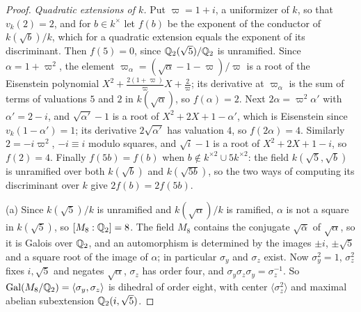 \begin{proof}
\emph{Quadratic extensions of $k$.} Put $\varpi=1+i$, a uniformizer of $k$,
so that $v_k(2)=2$, and for $b\in k^\times$ let $f(b)$ be the exponent of the
conductor of $k(\sqrt b)/k$, which for a quadratic extension equals the
exponent of its discriminant. Then $f(5)=0$, since $\mathbb Q_2(\sqrt5)/\mathbb Q_2$ is
unramified. Since $\alpha=1+\varpi^2$, the element
$\varpi_\alpha=(\sqrt\alpha-1-\varpi)/\varpi$ is a root of the Eisenstein
polynomial $X^2+\frac{2(1+\varpi)}\varpi X+\frac2\varpi$; its derivative at
$\varpi_\alpha$ is the sum of terms of valuations $5$ and $2$ in
$k(\sqrt\alpha)$, so $f(\alpha)=2$. Next $2\alpha=\varpi^2\alpha'$ with
$\alpha'=2-i$, and $\sqrt{\alpha'}-1$ is a root of $X^2+2X+1-\alpha'$, which
is Eisenstein since $v_k(1-\alpha')=1$; its derivative $2\sqrt{\alpha'}$ has
valuation $4$, so $f(2\alpha)=4$. Similarly $2=-i\varpi^2$, $-i\equiv i$
modulo squares, and $\sqrt i-1$ is a root of $X^2+2X+1-i$, so $f(2)=4$.
Finally $f(5b)=f(b)$ when $b\notin k^{\times2}\cup5k^{\times2}$: the field
$k(\sqrt5,\sqrt b)$ is unramified over both $k(\sqrt b)$ and $k(\sqrt{5b})$,
so the two ways of computing its discriminant over $k$ give $2f(b)=2f(5b)$.

(a) Since $k(\sqrt5)/k$ is unramified and $k(\sqrt\alpha)/k$ is ramified,
$\alpha$ is not a square in $k(\sqrt5)$, so $[M_8:\mathbb Q_2]=8$. The field $M_8$
contains the conjugate $\sqrt{\bar\alpha}$ of $\sqrt\alpha$, so it is Galois
over $\mathbb Q_2$, and an automorphism is determined by the images $\pm i$,
$\pm\sqrt5$ and a square root of the image of $\alpha$; in particular
$\sigma_y$ and $\sigma_z$ exist. Now $\sigma_y^2=1$, $\sigma_z^2$ fixes
$i,\sqrt5$ and negates $\sqrt\alpha$, $\sigma_z$ has order four, and
$\sigma_y\sigma_z\sigma_y=\sigma_z^{-1}$. So
$\operatorname{Gal}(M_8/\mathbb Q_2)=\langle\sigma_y,\sigma_z\rangle$ is dihedral of order eight,
with center $\langle\sigma_z^2\rangle$ and maximal abelian subextension
$\mathbb Q_2(i,\sqrt5)$.


\end{proof}
